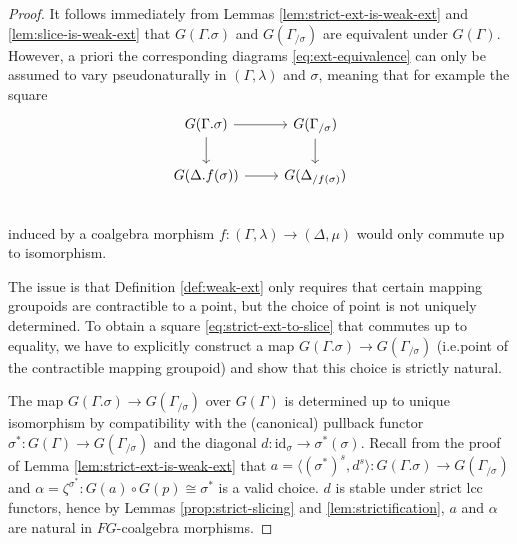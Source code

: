 \documentclass[a4paper]{article}
\theoremstyle{remark}
\theoremstyle{definition}
\begin{document}
\begin{proof}
  It follows immediately from Lemmas \ref{lem:strict-ext-is-weak-ext} and \ref{lem:slice-is-weak-ext} that $G(\Gamma.\sigma)$ and $G(\Gamma_{/ \sigma})$ are equivalent under $G(\Gamma)$.
  However, a priori the corresponding diagrams \eqref{eq:ext-equivalence} can only be assumed to vary pseudonaturally in $(\Gamma, \lambda)$ and $\sigma$, meaning that for example the square
  \begin{equation}
    \label{eq:strict-ext-to-slice}
    \begin{tikzcd}
      G(\Gamma.\sigma) \arrow[r] \arrow[d] & G(\Gamma_{/ \sigma}) \arrow[d] \\
      G(\Delta.f(\sigma)) \arrow[r] & G(\Delta_{/ f(\sigma)}) \\
    \end{tikzcd}
  \end{equation}
  induced by a coalgebra morphism $f : (\Gamma, \lambda) \rightarrow (\Delta, \mu)$ would only commute up to isomorphism.

  The issue is that Definition \ref{def:weak-ext} only requires that certain mapping groupoids are contractible to a point, but the choice of point is not uniquely determined.
  To obtain a square \eqref{eq:strict-ext-to-slice} that commutes up to equality, we have to explicitly construct a map $G(\Gamma.\sigma) \rightarrow G(\Gamma_{/ \sigma})$ (i.e.\@ point of the contractible mapping groupoid) and show that this choice is strictly natural.

  The map $G(\Gamma.\sigma) \rightarrow G(\Gamma_{/ \sigma})$ over $G(\Gamma)$ is determined up to unique isomorphism by compatibility with the (canonical) pullback functor $\sigma^* : G(\Gamma) \rightarrow G(\Gamma_{/ \sigma})$ and the diagonal $d : \mathrm{id}_\sigma \rightarrow \sigma^*(\sigma)$.
  Recall from the proof of Lemma \ref{lem:strict-ext-is-weak-ext} that $a = \langle (\sigma^*)^s, d^s \rangle : G(\Gamma.\sigma) \rightarrow G(\Gamma_{/ \sigma})$ and $\alpha = \zeta^{\sigma^*} : G(a) \circ G(p) \cong \sigma^*$ is a valid choice.
  $d$ is stable under strict lcc functors, hence by Lemmas \ref{prop:strict-slicing} and \ref{lem:strictification}, $a$ and $\alpha$ are natural in $FG$-coalgebra morphisms.


\end{proof}
\end{document}
